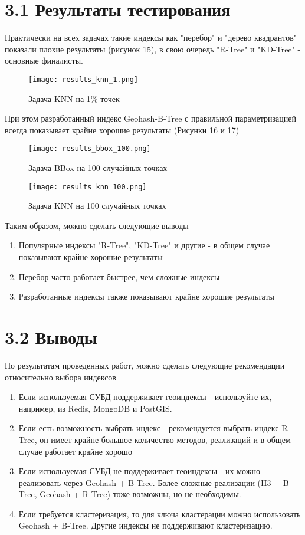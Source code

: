 \section{3.1 Результаты тестирования}

Практически на всех задачах такие индексы как "перебор" и "дерево квадрантов" показали плохие результаты (рисунок 15), в свою очередь "R-Tree" и "KD-Tree" - основные финалисты. 

\begin{figure}[h]
    \centering
    \texttt{[image: results\_knn\_1.png]}
    \caption{Задача KNN на 1\% точек}
\end{figure}


При этом разработанный индекс Geohash-B-Tree с правильной параметризацией всегда показывает крайне хорошие результаты (Рисунки 16 и 17)

\begin{figure}[h]
    \centering
    \texttt{[image: results\_bbox\_100.png]}
    \caption{Задача BBox на 100 случайных точках}
\end{figure}

\begin{figure}[h]
    \centering
    \texttt{[image: results\_knn\_100.png]}
    \caption{Задача KNN на 100 случайных точках}
\end{figure}


Таким образом, можно сделать следующие выводы
\begin{enumerate}
    \item Популярные индексы "R-Tree", "KD-Tree" и другие - в общем случае показывают крайне хорошие результаты 
    \item Перебор часто работает быстрее, чем сложные индексы
    \item Разработанные индексы также показывают крайне хорошие результаты
\end{enumerate}

\section{3.2 Выводы}
По результатам проведенных работ, можно сделать следующие рекомендации относительно выбора индексов
\begin{enumerate}
    \item Если используемая СУБД поддерживает геоиндексы - используйте их, например, из Redis, MongoDB и PostGIS.
    \item Если есть возможность выбрать индекс - рекомендуется выбрать индекс R-Tree, он имеет крайне большое количество методов, реализаций и в общем случае работает крайне хорошо
    \item Если используемая СУБД не поддерживает геоиндексы - их можно реализовать через Geohash + B-Tree. Более сложные реализации (H3 + B-Tree, Geohash + R-Tree) тоже возможны, но не необходимы.
    \item Если требуется кластеризация, то для ключа кластерации можно использовать Geohash + B-Tree. Другие индексы не поддерживают кластеризацию.
\end{enumerate}

